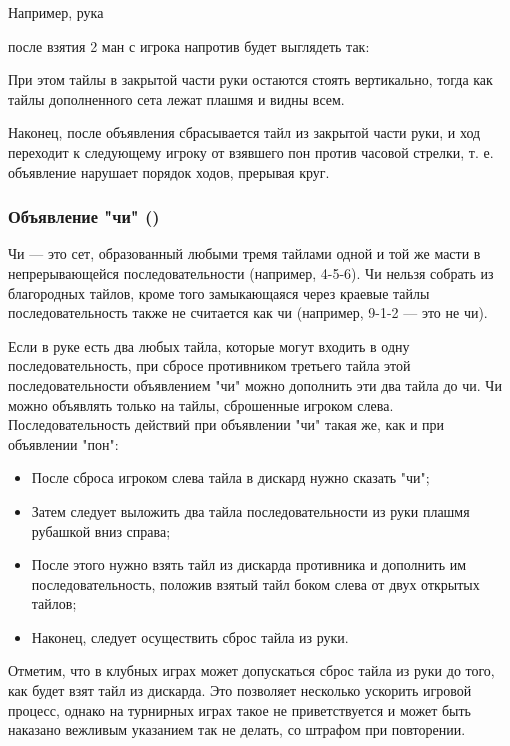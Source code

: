 
Например, рука


после взятия 2 ман с игрока напротив будет выглядеть так:

 \hfill {}

При этом тайлы в закрытой части руки остаются стоять вертикально, тогда как тайлы дополненного сета лежат плашмя и видны всем.

Наконец, после объявления сбрасывается тайл из закрытой части руки, и ход переходит к следующему игроку от взявшего пон против часовой стрелки, т. е. объявление нарушает порядок ходов, прерывая круг.

\subsubsection{Объявление "чи" ()}

Чи --- это сет, образованный любыми тремя тайлами одной и той же масти в непрерывающейся последовательности (например, 4-5-6). Чи нельзя собрать из благородных тайлов, кроме того замыкающаяся через краевые тайлы последовательность также не считается как чи (например, 9-1-2 --- это не чи).

Если в руке есть два любых тайла, которые могут входить в одну последовательность, при сбросе противником третьего тайла этой последовательности объявлением "чи" можно дополнить эти два тайла до чи. Чи можно объявлять только на тайлы, сброшенные игроком слева. Последовательность действий при объявлении "чи" такая же, как и при объявлении "пон":

\begin{itemize}
	\item После сброса игроком слева тайла в дискард нужно сказать "чи";
	\item Затем следует выложить два тайла последовательности из руки плашмя рубашкой вниз справа;
	\item После этого нужно взять тайл из дискарда противника и дополнить им последовательность, положив взятый тайл боком слева от двух открытых тайлов;
	\item Наконец, следует осуществить сброс тайла из руки.
\end{itemize}

Отметим, что в клубных играх может допускаться сброс тайла из руки до того, как будет взят тайл из дискарда. Это позволяет несколько ускорить игровой процесс, однако на турнирных играх такое не приветствуется и может быть наказано вежливым указанием так не делать, со штрафом при повторении.

